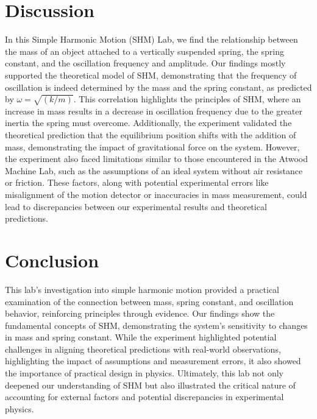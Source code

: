 \documentclass{report}
\begin{document}
    \section{Discussion}
    \bigbreak \noindent 
    In this Simple Harmonic Motion (SHM) Lab, we find the relationship between the mass of an object attached to a vertically suspended spring, the spring constant, and the oscillation frequency and amplitude. Our findings mostly supported the theoretical model of SHM, demonstrating that the frequency of oscillation is indeed determined by the mass and the spring constant, as predicted by $\omega = \sqrt{(k/m)}$. This correlation highlights the principles of SHM, where an increase in mass results in a decrease in oscillation frequency due to the greater inertia the spring must overcome. Additionally, the experiment validated the theoretical prediction that the equilibrium position shifts with the addition of mass, demonstrating the impact of gravitational force on the system.
    \bigbreak \noindent
    However, the experiment also faced limitations similar to those encountered in the Atwood Machine Lab, such as the assumptions of an ideal system without air resistance or friction. These factors, along with potential experimental errors like misalignment of the motion detector or inaccuracies in mass measurement, could lead to discrepancies between our experimental results and theoretical predictions. 


    \bigbreak \noindent 
    \section{Conclusion}
    \bigbreak \noindent 
    This lab's investigation into simple harmonic motion provided a practical examination of the connection between mass, spring constant, and oscillation behavior, reinforcing principles through evidence. Our findings show the fundamental concepts of SHM, demonstrating the system's sensitivity to changes in mass and spring constant. While the experiment highlighted potential challenges in aligning theoretical predictions with real-world observations, highlighting the impact of assumptions and measurement errors, it also showed the importance of practical design in physics. Ultimately, this lab not only deepened our understanding of SHM but also illustrated the critical nature of accounting for external factors and potential discrepancies in experimental physics.
\end{document}
